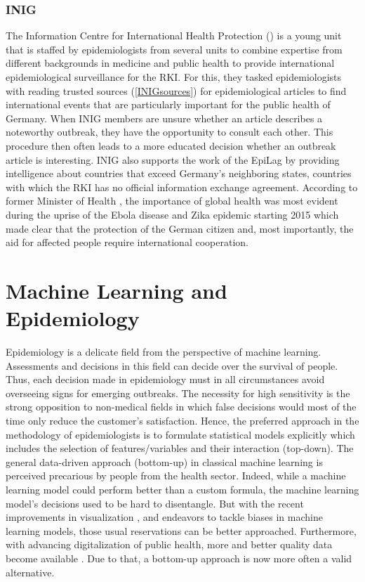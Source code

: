 \subsubsection{INIG}
The Information Centre for International Health Protection () is a young unit that is staffed by epidemiologists from several units to combine expertise from different backgrounds in medicine and public health to provide international epidemiological surveillance for the RKI.
For this, they tasked epidemiologists with reading trusted sources (\ref{INIGsources}) for epidemiological articles to find international events that are particularly important for the public health of Germany.
When INIG members are unsure whether an article describes a noteworthy outbreak, they have the opportunity to consult each other.
This procedure then often leads to a more educated decision whether an outbreak article is interesting.
INIG also supports the work of the EpiLag by providing intelligence about countries that exceed Germany's neighboring states, countries with which the RKI has no official information exchange agreement.
According to former Minister of Health \citeauthor{Grohe2017}, the importance of global health was most evident during the uprise of the Ebola disease and Zika epidemic starting 2015 which made clear that the protection of the German citizen and, most importantly, the aid for affected people require international cooperation.

\section{Machine Learning and Epidemiology}
Epidemiology is a delicate field from the perspective of machine learning.
Assessments and decisions in this field can decide over the survival of people.
Thus, each decision made in epidemiology must in all circumstances avoid overseeing signs for emerging outbreaks.
The necessity for high sensitivity is the strong opposition to non-medical fields in which false decisions would most of the time only reduce the customer's satisfaction.
Hence, the preferred approach in the methodology of epidemiologists is to formulate statistical models explicitly which includes the selection of features/variables and their interaction (top-down).
The general data-driven approach (bottom-up) in classical machine learning is perceived precarious by people from the health sector.
Indeed, while a machine learning model could perform better than a custom formula, the machine learning model's decisions used to be hard to disentangle.
But with the recent improvements in visualization \citep{Arras2017}, and endeavors to tackle biases in machine learning models, those usual reservations can be better approached.
Furthermore, with advancing digitalization of public health, more and better quality data become available \citep{DEMIS}.
Due to that, a bottom-up approach is now more often a valid alternative.

